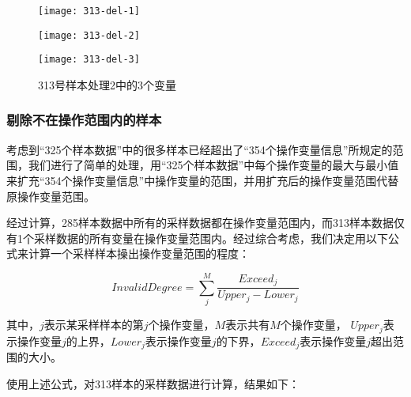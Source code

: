 \documentclass[bwprint]{gmcmthesis}
\begin{document}
\begin{figure}[htb]
    \centering
    \begin{minipage}[c]{0.35\textwidth}
        \centering
        \texttt{[image: 313-del-1]}
    \end{minipage}
    \begin{minipage}[c]{0.35\textwidth}
        \centering
        \texttt{[image: 313-del-2]}
    \end{minipage}
     \begin{minipage}[c]{0.35\textwidth}
        \centering
        \texttt{[image: 313-del-3]}
    \end{minipage}
    \caption{313号样本处理2中的3个变量}
\end{figure}




\FloatBarrier
\subsubsection{剔除不在操作范围内的样本}

考虑到“325个样本数据”中的很多样本已经超出了“354个操作变量信息”所规定的范围，我们进行了简单的处理，用“325个样本数据”中每个操作变量的最大与最小值来扩充“354个操作变量信息”中操作变量的范围，并用扩充后的操作变量范围代替原操作变量范围。

经过计算，285样本数据中所有的采样数据都在操作变量范围内，而313样本数据仅有1个采样数据的所有变量在操作变量范围内。经过综合考虑，我们决定用以下公式来计算一个采样样本操出操作变量范围的程度：

\begin{equation}
	InvalidDegree=\sum^M_j{\frac{Exceed_j}{Upper_j - Lower_j}}
	\label{eq:range-invalid-degree}
\end{equation}

其中，$j$表示某采样样本的第$j$个操作变量，$M$表示共有$M$个操作变量， $Upper_j$表示操作变量$j$的上界，$Lower_j$表示操作变量$j$的下界，$Exceed_j$表示操作变量$j$超出范围的大小。

使用上述公式，对313样本的采样数据进行计算，结果如下：
\end{document}
